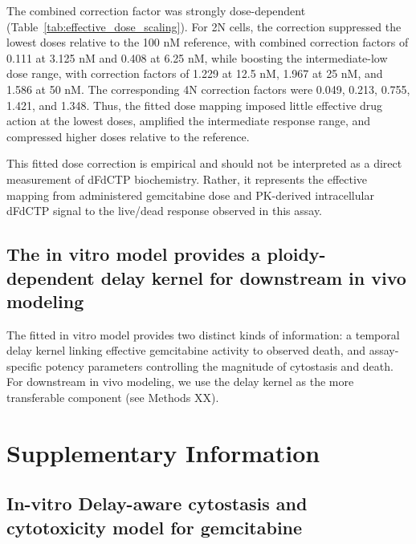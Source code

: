 \documentclass[11pt,notitlepage]{article}
\begin{document}
The combined correction factor was strongly dose-dependent (Table~\ref{tab:effective_dose_scaling}). For 2N cells, the correction suppressed the lowest doses relative to the 100 nM reference, with combined correction factors of 0.111 at 3.125 nM and 0.408 at 6.25 nM, while boosting the intermediate-low dose range, with correction factors of 1.229 at 12.5 nM, 1.967 at 25 nM, and 1.586 at 50 nM. The corresponding 4N correction factors were 0.049, 0.213, 0.755, 1.421, and 1.348. Thus, the fitted dose mapping imposed little effective drug action at the lowest doses, amplified the intermediate response range, and compressed higher doses relative to the reference.

This fitted dose correction is empirical and should not be interpreted as a direct measurement of dFdCTP biochemistry. Rather, it represents the effective mapping from administered gemcitabine dose and PK-derived intracellular dFdCTP signal to the live/dead response observed in this assay.

\subsection*{The in vitro model provides a ploidy-dependent delay kernel for downstream in vivo modeling}

The fitted in vitro model provides two distinct kinds of information: a temporal delay kernel linking effective gemcitabine activity to observed death, and assay-specific potency parameters controlling the magnitude of cytostasis and death. For downstream in vivo modeling, we use the delay kernel as the more transferable component (see Methods XX).


  
\clearpage

\renewcommand{\figurename}{Supplementary Figure}
\setcounter{figure}{0}  
\renewcommand{\tablename}{Supplementary Table}
\setcounter{table}{0}  



\section*{Supplementary Information}


\subsection*{In-vitro Delay-aware cytostasis and cytotoxicity model for gemcitabine}
\end{document}
